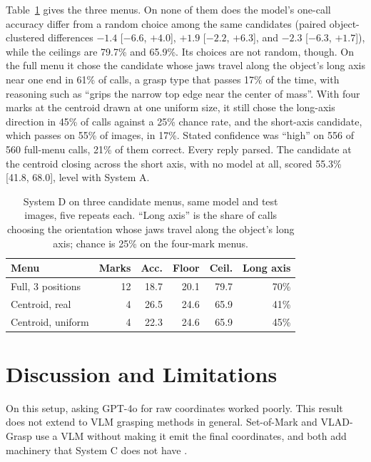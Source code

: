 \documentclass[10pt,conference,compsoc]{IEEEtran}
\begin{document}
Table~\ref{tab:menus} gives the three menus. On none of them does the
model's one-call accuracy differ from a random choice among the same
candidates (paired object-clustered differences $-1.4$ [$-6.6$, $+4.0$],
$+1.9$ [$-2.2$, $+6.3$], and $-2.3$ [$-6.3$, $+1.7$]), while the ceilings
are 79.7\% and 65.9\%. Its choices are not random, though. On the full
menu it chose the candidate whose jaws travel along the object's long axis
near one end in 61\% of calls, a grasp type that passes 17\% of the time,
with reasoning such as ``grips the narrow top edge near the center of
mass''. With four marks at the centroid drawn at one uniform size, it still
chose the long-axis direction in 45\% of calls against a 25\% chance rate,
and the short-axis candidate, which passes on 55\% of images, in 17\%.
Stated confidence was ``high'' on 556 of 560 full-menu calls, 21\% of them
correct. Every reply parsed. The candidate at the centroid closing across
the short axis, with no model at all, scored 55.3\% [41.8, 68.0], level
with System A.

\begin{table}[t]
\caption{System D on three candidate menus, same model and test images,
five repeats each. ``Long axis'' is the share of calls choosing the
orientation whose jaws travel along the object's long axis; chance is 25\%
on the four-mark menus.}
\label{tab:menus}
\centering
\footnotesize
\begin{tabular}{lrrrrr}
\toprule
Menu & Marks & Acc. & Floor & Ceil. & Long axis \\
\midrule
Full, 3 positions & 12 & 18.7 & 20.1 & 79.7 & 70\% \\
Centroid, real & 4 & 26.5 & 24.6 & 65.9 & 41\% \\
Centroid, uniform & 4 & 22.3 & 24.6 & 65.9 & 45\% \\
\bottomrule
\end{tabular}
\end{table}

\section{Discussion and Limitations}

On this setup, asking GPT-4o for raw coordinates worked poorly. This result
does not extend to VLM grasping methods in general. Set-of-Mark and VLAD-Grasp
use a VLM without making it emit the final coordinates, and both add machinery
that System C does not have \cite{yang2024,kulshrestha2025}.
\end{document}
